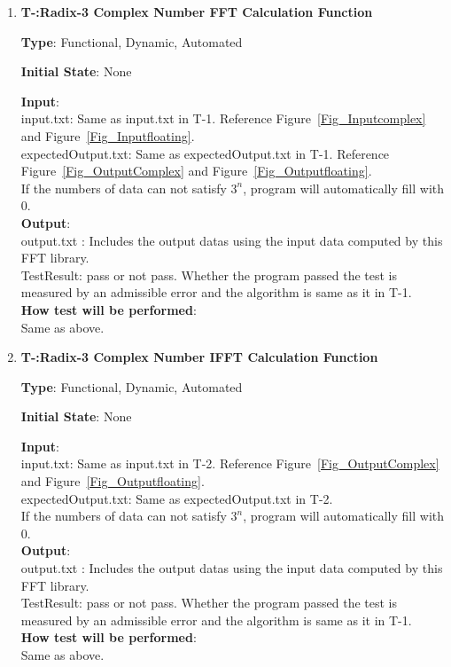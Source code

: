 \documentclass[12pt, titlepage]{article}
\newcounter{tnum}
\begin{document}
\begin{enumerate}

\item{\textbf{T-\thetnum \label{R3CFFT}:Radix-3 Complex  Number FFT Calculation Function}}

\textbf {Type}: Functional, Dynamic, Automated

\textbf {Initial State}: None
					
\textbf {Input}:\\
{\large input.txt}: Same as input.txt in T-1. Reference   Figure~\ref{Fig_Inputcomplex} and Figure~\ref{Fig_Inputfloating}.\\
{\large expectedOutput.txt}: Same as  expectedOutput.txt in T-1.  Reference Figure~\ref{Fig_OutputComplex} and Figure~\ref{Fig_Outputfloating}.\\
If the numbers of data can not satisfy $3^n$, program will automatically fill with 0.\\
					
\textbf {Output}: \\{\large output.txt} : Includes the output datas using the input data computed by this FFT library.\\
{\large TestResult}: pass or not pass. Whether the program passed the test is measured by an admissible error and the algorithm is same as it in T-1.\\
		
\textbf {How test will be performed}: \\
Same as above.

\item{\textbf{T-\thetnum \label{R3CIFFT}:Radix-3 Complex Number IFFT Calculation Function}}

\textbf {Type}: Functional, Dynamic, Automated
					
\textbf {Initial State}: None
					
\textbf {Input}:\\
{\large input.txt}: Same as input.txt in T-2. Reference Figure~\ref{Fig_OutputComplex} and Figure~\ref{Fig_Outputfloating}.\\
{\large expectedOutput.txt}: Same as  expectedOutput.txt in T-2. \\
If the numbers of data can not satisfy $3^n$, program will automatically fill with 0.\\
					
\textbf {Output}: \\{\large output.txt} : Includes the output datas using the input data computed by this FFT library.\\
{\large TestResult}: pass or not pass. Whether the program passed the test is measured by an admissible error and the algorithm is same as it in T-1.\\

\textbf {How test will be performed}: \\
Same as above.
\end{enumerate}
\end{document}
